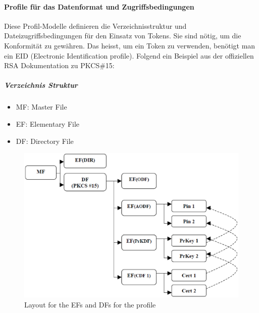 \documentclass[10pt,a4paper]{article}
\begin{document}
\paragraph{Profile für das Datenformat und Zugriffsbedingungen}
Diese Profil-Modelle definieren die Verzeichnisstruktur und Dateizugriffsbedingungen für
den Einsatz von Tokens. Sie sind nötig, um die Konformität zu gewähren. Das heisst, um ein
Token zu verwenden, benötigt man ein EID (Electronic Identification profile). Folgend ein
Beispiel aus der offiziellen RSA Dokumentation zu PKCS\#15:

\subparagraph{Verzeichnis Struktur}
\begin{itemize}
    \item MF: Master File
    \item EF: Elementary File
    \item DF: Directory File
\end{itemize}

\begin{figure}[ht]
    \centering
    \includegraphics[scale=0.42]{images/layout-ef-df}
    \caption{Layout for the EFs and DFs for the profile}
    \label{fig:layout-ef-df}
\end{figure}
\end{document}

